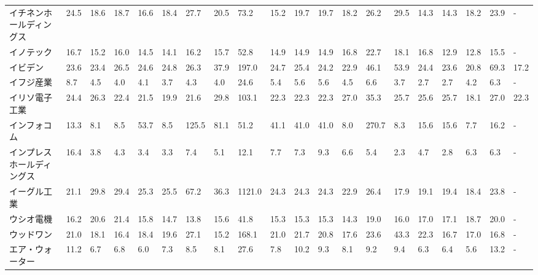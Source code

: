 \begin{longtable}[c]{lp{3mm}p{3mm}p{3mm}p{3mm}p{3mm}p{3mm}p{3mm}p{3mm}p{3mm}p{3mm}p{3mm}p{3mm}p{3mm}p{3mm}p{3mm}p{3mm}p{3mm}p{3mm}p{3mm}}
イチネンホールディングス    &   24.5 &   18.6 &      18.7 &      16.6 &       18.4 &    27.7 &    20.5 &     73.2 &    15.2 &    19.7 &   19.7 &   18.2 &    26.2 &    29.5 &    14.3 &   14.3 &   18.2 &    23.9 &      - \\
イノテック           &   16.7 &   15.2 &      16.0 &      14.5 &       14.1 &    16.2 &    15.7 &     52.8 &    14.9 &    14.9 &   14.9 &   16.8 &    22.7 &    18.1 &    16.8 &   12.9 &   12.8 &    15.5 &      - \\
イビデン            &   23.6 &   23.4 &      26.5 &      24.6 &       24.8 &    26.3 &    37.9 &    197.0 &    24.7 &    25.4 &   24.2 &   22.9 &    46.1 &    53.9 &    24.4 &   23.6 &   20.8 &    69.3 &   17.2 \\
イフジ産業           &    8.7 &    4.5 &       4.0 &       4.1 &        3.7 &     4.3 &     4.0 &     24.6 &     5.4 &     5.6 &    5.6 &    4.5 &     6.6 &     3.7 &     2.7 &    2.7 &    4.2 &     6.3 &      - \\
イリソ電子工業         &   24.4 &   26.3 &      22.4 &      21.5 &       19.9 &    21.6 &    29.8 &    103.1 &    22.3 &    22.3 &   22.3 &   27.0 &    35.3 &    25.7 &    25.6 &   25.7 &   18.1 &    27.0 &   22.3 \\
インフォコム          &   13.3 &    8.1 &       8.5 &      53.7 &        8.5 &   125.5 &    81.1 &     51.2 &    41.1 &    41.0 &   41.0 &    8.0 &   270.7 &     8.3 &    15.6 &   15.6 &    7.7 &    16.2 &      - \\
インプレスホールディングス   &   16.4 &    3.8 &       4.3 &       3.4 &        3.3 &     7.4 &     5.1 &     12.1 &     7.7 &     7.3 &    9.3 &    6.6 &     5.4 &     2.3 &     4.7 &    2.8 &    6.3 &     6.3 &      - \\
イーグル工業          &   21.1 &   29.8 &      29.4 &      25.3 &       25.5 &    67.2 &    36.3 &   1121.0 &    24.3 &    24.3 &   24.3 &   22.9 &    26.4 &    17.9 &    19.1 &   19.4 &   18.4 &    23.8 &      - \\
ウシオ電機           &   16.2 &   20.6 &      21.4 &      15.8 &       14.7 &    13.8 &    15.6 &     41.8 &    15.3 &    15.3 &   15.3 &   14.3 &    19.0 &    16.0 &    17.0 &   17.1 &   18.7 &    20.0 &      - \\
ウッドワン           &   21.0 &   18.1 &      16.4 &      18.4 &       19.6 &    27.1 &    15.2 &    168.1 &    21.0 &    21.7 &   20.8 &   17.6 &    23.6 &    43.3 &    22.3 &   16.7 &   17.0 &    16.8 &      - \\
エア・ウォーター        &   11.2 &    6.7 &       6.8 &       6.0 &        7.3 &     8.5 &     8.1 &     27.6 &     7.8 &    10.2 &    9.3 &    8.1 &     9.2 &     9.4 &     6.3 &    6.4 &    5.6 &    13.2 &      - \\

\end{longtable}
